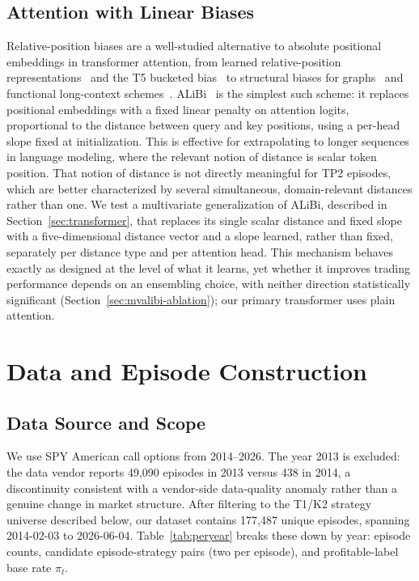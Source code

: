 \documentclass[sigconf,review,anonymous]{acmart}
\begin{document}
\subsection{Attention with Linear Biases}
Relative-position biases are a well-studied alternative to absolute positional embeddings in transformer attention, from learned relative-position representations~\cite{shaw2018self} and the T5 bucketed bias~\cite{raffel2020t5} to structural biases for graphs~\cite{ying2021graphormer} and functional long-context schemes~\cite{li2024fire}. ALiBi~\cite{press2022alibi} is the simplest such scheme: it replaces positional embeddings with a fixed linear penalty on attention logits, proportional to the distance between query and key positions, using a per-head slope fixed at initialization. This is effective for extrapolating to longer sequences in language modeling, where the relevant notion of distance is scalar token position. That notion of distance is not directly meaningful for TP2 episodes, which are better characterized by several simultaneous, domain-relevant distances rather than one. We test a multivariate generalization of ALiBi, described in Section~\ref{sec:transformer}, that replaces its single scalar distance and fixed slope with a five-dimensional distance vector and a slope learned, rather than fixed, separately per distance type and per attention head. This mechanism behaves exactly as designed at the level of what it learns, yet whether it improves trading performance depends on an ensembling choice, with neither direction statistically significant (Section~\ref{sec:mvalibi-ablation}); our primary transformer uses plain attention.

\section{Data and Episode Construction}
\label{sec:data}

\subsection{Data Source and Scope}
\label{sec:data-source}
We use SPY American call options from 2014--2026. The year 2013 is excluded: the data vendor reports 49{,}090 episodes in 2013 versus 438 in 2014, a discontinuity consistent with a vendor-side data-quality anomaly rather than a genuine change in market structure. After filtering to the T1/K2 strategy universe described below, our dataset contains 177{,}487 unique episodes, spanning 2014-02-03 to 2026-06-04. Table~\ref{tab:peryear} breaks these down by year: episode counts, candidate episode-strategy pairs (two per episode), and profitable-label base rate $\pi_t$.
\end{document}
